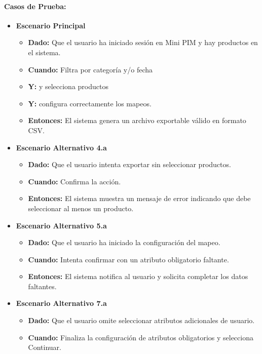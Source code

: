 \paragraph{Casos de Prueba:}
\begin{itemize}
    \item \textbf{Escenario Principal}
    \begin{itemize}
        \item \textbf{Dado:} Que el usuario ha iniciado sesión en Mini PIM y hay productos en el sistema.
        \item \textbf{Cuando:} Filtra por categoría y/o fecha
        \item \textbf{Y:} y selecciona productos
        \item \textbf{Y:} configura correctamente los mapeos.
        \item \textbf{Entonces:} El sistema genera un archivo exportable válido en formato CSV.
    \end{itemize}
    \item \textbf{Escenario Alternativo 4.a}
    \begin{itemize}
        \item \textbf{Dado:} Que el usuario intenta exportar sin seleccionar productos.
        \item \textbf{Cuando:} Confirma la acción.
        \item \textbf{Entonces:} El sistema muestra un mensaje de error indicando que debe seleccionar al menos un producto.
    \end{itemize}
    \item \textbf{Escenario Alternativo 5.a}
    \begin{itemize}
        \item \textbf{Dado:} Que el usuario ha iniciado la configuración del mapeo.
        \item \textbf{Cuando:} Intenta confirmar con un atributo obligatorio faltante.
        \item \textbf{Entonces:} El sistema notifica al usuario y solicita completar los datos faltantes.
    \end{itemize}
    \item \textbf{Escenario Alternativo 7.a}
    \begin{itemize}
        \item \textbf{Dado:} Que el usuario omite seleccionar atributos adicionales de usuario.
        \item \textbf{Cuando:} Finaliza la configuración de atributos obligatorios y selecciona Continuar.

\end{itemize}
\end{itemize}
